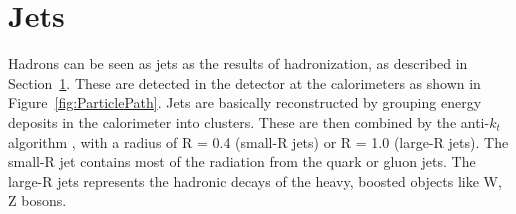 \begin{table}[ht]
 \label{tab:muon_selection}
 \caption{Summary of muon selection used in this analysis}
\end{table}

\section{Jets}
Hadrons can be seen as jets as the results of hadronization, as described in Section~\ref{}.
These are detected in the detector at the calorimeters as shown in Figure~\ref{fig:ParticlePath}.
Jets are basically reconstructed by grouping energy deposits in the calorimeter into clusters. These are then combined by the anti-$k_t$ algorithm \cite{Cacciari_2008}, with a radius of R = 0.4 (small-R jets) or R = 1.0 (large-R jets). The small-R jet contains most of the radiation from the quark or gluon jets. The large-R jets represents the hadronic decays of the heavy, boosted objects like W, Z bosons.

